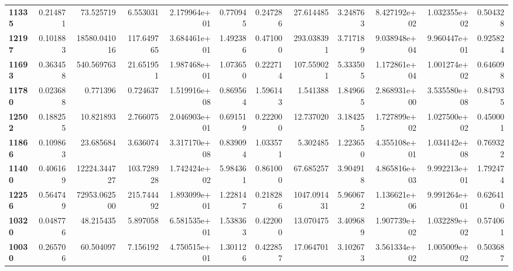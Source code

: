 \begin{table}[h]
\begin{tabular}{lrrrrrrrrrrr}
\textbf{11335} &  0.214871 &      73.525719 &        6.553031 &               2.179964e+01 &  0.770945 &  0.247286 &    27.614485 &   3.248763 &  8.427192e+02 &  1.032355e+02 &     0.504328 \\
\textbf{12197} &  0.101883 &   18580.041016 &      117.649765 &               3.684461e+01 &  1.492386 &  0.471000 &   293.038391 &   3.717189 &  9.038948e+04 &  9.960447e+01 &     0.925824 \\
\textbf{11693} &  0.363458 &     540.569763 &       21.651951 &               1.987468e+01 &  1.073650 &  0.222714 &   107.559021 &   5.333505 &  1.172861e+04 &  1.001274e+02 &     0.646098 \\
\textbf{11780} &  0.023688 &       0.771396 &        0.724637 &               1.519916e+08 &  0.869564 &  1.596143 &     1.541388 &   1.849665 &  2.868931e+00 &  3.535580e+08 &     0.847935 \\
\textbf{12502} &  0.188255 &      10.821893 &        2.766075 &               2.046903e+01 &  0.691519 &  0.222000 &    12.737020 &   3.184255 &  1.727899e+02 &  1.027500e+02 &     0.450001 \\
\textbf{11866} &  0.109863 &      23.685684 &        3.636074 &               3.317170e+08 &  0.839094 &  1.033571 &     5.302485 &   1.223650 &  4.355108e+01 &  1.034142e+08 &     0.769322 \\
\textbf{11400} &  0.406169 &   12224.344727 &      103.728928 &               1.742424e+02 &  5.984361 &  0.861000 &    67.685257 &   3.904918 &  4.865816e+03 &  9.992213e+01 &     1.792474 \\
\textbf{12256} &  0.564749 &   72953.062500 &      215.744492 &               1.893099e+01 &  1.228147 &  0.218286 &  1047.091431 &   5.960672 &  1.136621e+06 &  9.991264e+01 &     0.626410 \\
\textbf{10320} &  0.048776 &      48.215435 &        5.897058 &               6.581535e+01 &  1.538363 &  0.422000 &    13.070475 &   3.409689 &  1.907739e+02 &  1.032289e+02 &     0.574061 \\
\textbf{10030} &  0.265706 &      60.504097 &        7.156192 &               4.750515e+01 &  1.301126 &  0.422857 &    17.064701 &   3.102673 &  3.561334e+02 &  1.005009e+02 &     0.503687 \\
\bottomrule
\end{tabular}
\end{table}
